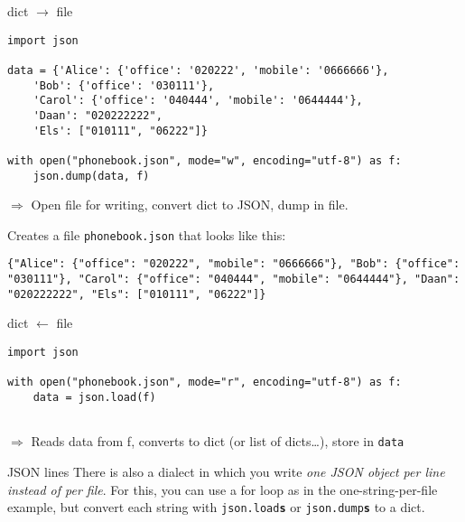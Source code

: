 




\begin{frame}[fragile]{dict $\rightarrow$ file}
\begin{verbatim}
import json

data = {'Alice': {'office': '020222', 'mobile': '0666666'},
    'Bob': {'office': '030111'},
    'Carol': {'office': '040444', 'mobile': '0644444'},
    'Daan': "020222222",
    'Els': ["010111", "06222"]}

with open("phonebook.json", mode="w", encoding="utf-8") as f:
    json.dump(data, f)

\end{verbatim}
$\Rightarrow$ Open file for writing, convert dict to JSON, dump in file.

Creates a file \texttt{phonebook.json} that looks like this:
\begin{verbatim}
{"Alice": {"office": "020222", "mobile": "0666666"}, "Bob": {"office": "030111"}, "Carol": {"office": "040444", "mobile": "0644444"}, "Daan": "020222222", "Els": ["010111", "06222"]}
\end{verbatim}
\end{frame}




\begin{frame}[fragile]{dict $\leftarrow$ file}
\begin{verbatim}
import json

with open("phonebook.json", mode="r", encoding="utf-8") as f:
	data = json.load(f)
	
\end{verbatim}

$\Rightarrow$ Reads data from f, converts to dict (or list of dicts\ldots), store in \texttt{data}

\pause

\small
\begin{alertblock}{JSON lines}
There is also a dialect in which you write \emph{one JSON object per line instead of per file}. For this, you can use a for loop as in the one-string-per-file example, but convert each string with  \texttt{json.load\textbf{s}} or \texttt{json.dump\textbf{s}} to a dict.
\end{alertblock}


\end{frame}




